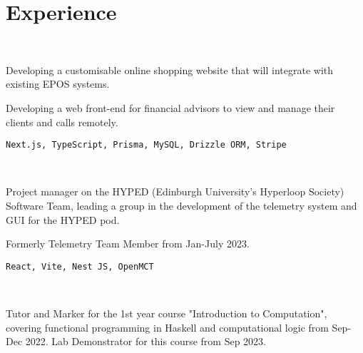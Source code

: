 \documentclass[]{hieudo-build}
\begin{document}
\begin{minipage}[t]{0.62\textwidth}

	\section{Experience}

	\\
	\vspace{0.9em} %
	\begin{tightemize}
		\item Developing a customisable online shopping website that will integrate with existing EPOS systems.
        \item Developing a web front-end for financial advisors to view and manage their clients and calls remotely.
	\end{tightemize}
	\verb|Next.js, TypeScript, Prisma, MySQL, Drizzle ORM, Stripe|
	\sectionsep

	\\
	\begin{tightemize}
		\item Project manager on the HYPED (Edinburgh University's Hyperloop Society) Software Team, leading a group in the development of the telemetry system and GUI for the HYPED pod.
        \item Formerly Telemetry Team Member from Jan-July 2023.
	\end{tightemize}
	\verb|React, Vite, Nest JS, OpenMCT|
	\sectionsep

	\\
	\begin{tightemize}
		\item Tutor and Marker for the 1st year course "Introduction to Computation", covering functional programming in Haskell and computational logic from Sep-Dec 2022. Lab Demonstrator for this course from Sep 2023.
	\end{tightemize}
	\sectionsep



\end{minipage}
\end{document}
